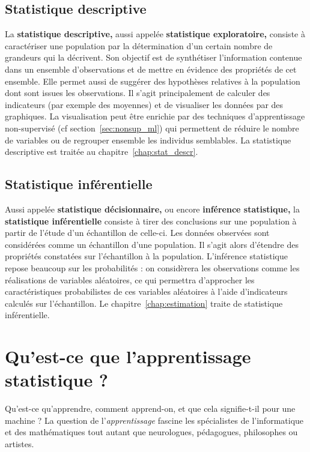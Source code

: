 \subsection{Statistique descriptive} 
La \textbf{statistique descriptive,} aussi appelée \textbf{statistique
	exploratoire,} consiste à caractériser une population par la détermination
d'un certain nombre de grandeurs qui la décrivent. Son objectif est de
synthétiser l'information contenue dans un ensemble d'observations et de mettre
en évidence des propriétés de cet ensemble. Elle permet aussi de suggérer des
hypothèses relatives à la population dont sont issues les observations. Il
s'agit principalement de calculer des indicateurs (par exemple des moyennes) et
de visualiser les données par des graphiques. La visualisation peut être
enrichie par des techniques d'apprentissage non-supervisé (cf
section~\ref{sec:nonsup_ml}) qui permettent de réduire le nombre de variables
ou de regrouper ensemble les individus semblables.  La statistique descriptive
est traitée au chapitre~\ref{chap:stat_descr}.

\subsection{Statistique inférentielle} 
Aussi appelée \textbf{statistique décisionnaire,} ou encore \textbf{inférence
	statistique,} la \textbf{statistique inférentielle} consiste à tirer des
conclusions sur une population à partir de l'étude d'un échantillon de
celle-ci. Les données observées sont considérées comme un échantillon d'une
population. Il s'agit alors d'étendre des propriétés constatées sur
l'échantillon à la population. L'inférence statistique repose beaucoup sur les
probabilités : on considèrera les observations comme les réalisations de
variables aléatoires, ce qui permettra d'approcher les caractéristiques
probabilistes de ces variables aléatoires à l'aide d'indicateurs calculés sur
l'échantillon. Le chapitre~\ref{chap:estimation} traite de statistique
inférentielle.

\section{Qu'est-ce que l'apprentissage statistique ?}
Qu'est-ce qu'apprendre, comment apprend-on, et que cela signifie-t-il pour une
machine ? La question de l'{\it apprentissage} fascine les spécialistes de
l'informatique et des mathématiques tout autant que neurologues, pédagogues,
philosophes ou artistes.

